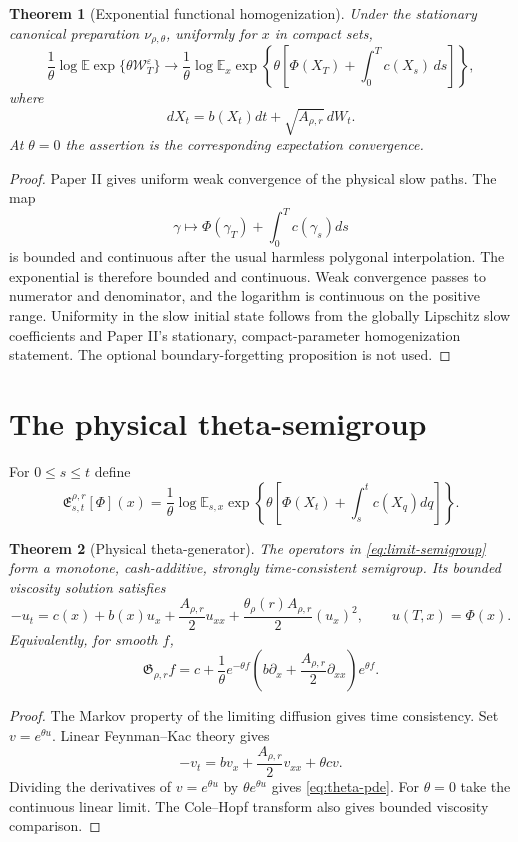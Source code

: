 \documentclass[11pt,reqno]{amsart}
\newtheorem{theorem}{Theorem}[section]
\theoremstyle{definition}
\theoremstyle{remark}
\newcommand{\E}{\mathbb E}
\begin{document}
\begin{theorem}[Exponential functional homogenization]\label{thm:exp-hom}
Under the stationary canonical preparation $\nu_{\rho,\theta}$, uniformly
for $x$ in compact sets,
\[
 \frac1\theta\log
 \E\exp\{\theta\mathcal W_T^\varepsilon\}
 \longrightarrow
 \frac1\theta\log
 \E_x\exp\left\{\theta\left[
 \Phi(X_T)+\int_0^Tc(X_s)\,ds\right]\right\},
\]
where
\[
 dX_t=b(X_t)dt+\sqrt{A_{\rho,r}}\,dW_t.
\]
At $\theta=0$ the assertion is the corresponding expectation convergence.
\end{theorem}
\begin{proof}
Paper II gives uniform weak convergence of the physical slow paths.  The map
\[
 \gamma\mapsto\Phi(\gamma_T)+\int_0^Tc(\gamma_s)ds
\]
is bounded and continuous after the usual harmless polygonal interpolation.
The exponential is therefore bounded and continuous.  Weak convergence passes
to numerator and denominator, and the logarithm is continuous on the positive
range.  Uniformity in the slow initial state follows from the globally Lipschitz slow
coefficients and Paper II's stationary, compact-parameter homogenization
statement.  The optional boundary-forgetting proposition is not used.
\end{proof}

\section{The physical theta-semigroup}\label{sec:semigroup}
For $0\le s\le t$ define
\begin{equation}\label{eq:limit-semigroup}
 \mathfrak E_{s,t}^{\rho,r}[\Phi](x)
 =\frac1\theta\log\E_{s,x}\exp\left\{
 \theta\left[
 \Phi(X_t)+\int_s^tc(X_q)dq\right]\right\}.
\end{equation}

\begin{theorem}[Physical theta-generator]\label{thm:generator}
The operators in \eqref{eq:limit-semigroup} form a monotone, cash-additive,
strongly time-consistent semigroup.  Its bounded viscosity solution satisfies
\begin{equation}\label{eq:theta-pde}
 -u_t
 =c(x)+b(x)u_x
 +\frac{A_{\rho,r}}2u_{xx}
 +\frac{\theta_\rho(r)A_{\rho,r}}2(u_x)^2,
 \qquad u(T,x)=\Phi(x).
\end{equation}
Equivalently, for smooth $f$,
\[
 \mathfrak G_{\rho,r}f
 =c+\frac1\theta e^{-\theta f}
 \left(b\partial_x+\frac{A_{\rho,r}}2\partial_{xx}\right)
 e^{\theta f}.
\]
\end{theorem}
\begin{proof}
The Markov property of the limiting diffusion gives time consistency.
Set $v=e^{\theta u}$.  Linear Feynman--Kac theory gives
\[
 -v_t=bv_x+\frac{A_{\rho,r}}2v_{xx}+\theta c v.
\]
Dividing the derivatives of $v=e^{\theta u}$ by $\theta e^{\theta u}$ gives
\eqref{eq:theta-pde}.  For $\theta=0$ take the continuous linear limit.
The Cole--Hopf transform also gives bounded viscosity comparison.
\end{proof}
\end{document}
